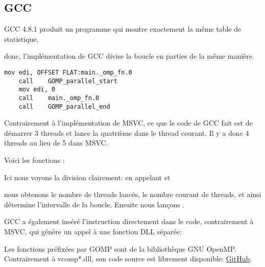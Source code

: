 \subsection{GCC}

GCC 4.8.1 produit un programme qui montre exactement la même table de statistique,

donc, l'implémentation de GCC divise la boucle en parties de la même manière.

\begin{lstlisting}[caption=GCC 4.8.1,style=customasmx86]
	mov	edi, OFFSET FLAT:main._omp_fn.0
	call	GOMP_parallel_start
	mov	edi, 0
	call	main._omp_fn.0
	call	GOMP_parallel_end
\end{lstlisting}

Contrairement à l'implémentation de MSVC, ce que le code de GCC fait est de démarrer
3 threads et lance la quatrième dans le thread courant. Il y a donc 4 threads au
lieu de 5 dans MSVC.

Voici les fonctions :



Ici nous voyons la division clairement: en appelant
 et 

nous obtenons le nombre de threads lancés, le nombre courant de threads,
et ainsi détermine l'intervalle de la boucle.
Ensuite nous lançons .

GCC a également inséré l'instruction  directement dans le code, contrairement
à MSVC, qui génère un appel à une fonction DLL séparée:



Les fonctions préfixées par GOMP sont de la bibliothèque GNU OpenMP.
Contrairement à vcomp*.dll, son code source est librement disponible:
\href{https://github.com/mirrors/gcc/tree/master/libgomp}{GitHub}.

